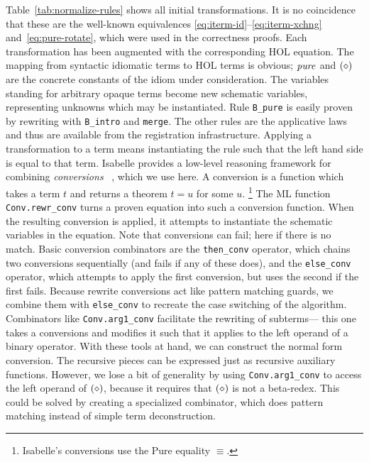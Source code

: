 Table~\ref{tab:normalize-rules} shows all initial transformations.
It is no coincidence that these are the well-known equivalences
\eqref{eq:iterm-id}--\eqref{eq:iterm-xchng} and~\eqref{eq:pure-rotate}, which
were used in the correctness proofs.
Each transformation has been augmented with the corresponding HOL equation.
The mapping from syntactic idiomatic terms to HOL terms is obvious;
$\operatorname{\mathit{pure}}$ and $(\diamond)$ are the concrete constants of the idiom under consideration.
The variables standing for arbitrary opaque terms become new schematic variables,
representing unknowns which may be instantiated.
Rule \texttt{B\_pure} is easily proven by rewriting with \texttt{B\_intro} and
\texttt{merge}.
The other rules are the applicative laws and thus are available from the
registration infrastructure.
Applying a transformation to a term means instantiating the rule such that the
left hand side is equal to that term.
Isabelle provides a low-level reasoning framework for combining \emph{conversions}~
\cite{paulson83}, which we use here.
A conversion is a function which takes a term $t$ and returns a theorem
$t = u$ for some $u$.%
\footnote{Isabelle's conversions use the Pure equality $\equiv$.}
The ML function \verb+Conv.rewr_conv+ turns a proven equation into such a
conversion function.
When the resulting conversion is applied, it attempts to instantiate the
schematic variables in the equation.
Note that conversions can fail; here if there is no match.
Basic conversion combinators are the \verb+then_conv+ operator, which chains
two conversions sequentially (and fails if any of these does),
and the \verb+else_conv+ operator, which attempts to apply the first conversion,
but uses the second if the first fails.
Because rewrite conversions act like pattern matching guards, we combine them
with \verb+else_conv+ to recreate the case switching of the algorithm.
Combinators like \verb+Conv.arg1_conv+ facilitate the rewriting of subterms---%
this one takes a conversions and modifies it such that it applies to the left
operand of a binary operator.
With these tools at hand, we can construct the normal form conversion.
The recursive pieces can be expressed just as recursive auxiliary functions.
However, we lose a bit of generality by using \verb+Conv.arg1_conv+ to access
the left operand of $(\diamond)$, because it requires that $(\diamond)$ is not a
beta-redex.
This could be solved by creating a specialized combinator, which does pattern
matching instead of simple term deconstruction.


